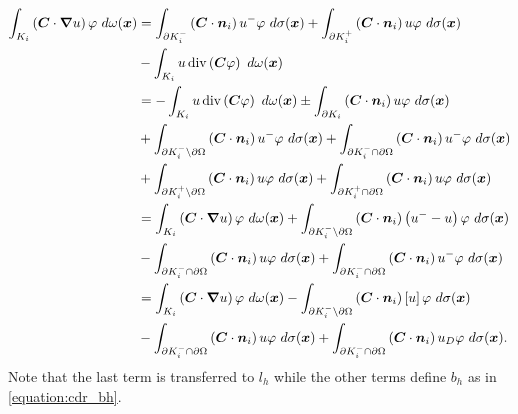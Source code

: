 \begin{align}
    \int_{K_i} \left( \bm{C} \cdot \bm{\nabla} u \right) \varphi ~ d \omega(\bm{x}) &= \int_{\partial K_i^-} \left( \bm{C} \cdot \bm{n}_i \right) u^- \varphi ~ d \sigma(\bm{x}) + \int_{\partial K_i^+} \left( \bm{C} \cdot \bm{n}_i \right) u \varphi ~ d \sigma(\bm{x}) \notag \\
    &- \int_{K_i} u \operatorname*{div} \left( \bm{C} \varphi \right) ~ d \omega(\bm{x}) \notag \\
    &= - \int_{K_i} u \operatorname*{div} \left( \bm{C} \varphi \right) ~ d \omega(\bm{x}) \pm \int_{\partial K_i} \left( \bm{C} \cdot \bm{n}_i \right) u \varphi ~ d \sigma(\bm{x}) \notag \\
    &+ \int_{\partial K_i^- \setminus \partial \Omega} \left( \bm{C} \cdot \bm{n}_i \right) u^- \varphi ~ d \sigma(\bm{x}) + \int_{\partial K_i^- \cap \partial \Omega} \left( \bm{C} \cdot \bm{n}_i \right) u^- \varphi ~ d \sigma(\bm{x}) \notag \\
    &+ \int_{\partial K_i^+ \setminus \partial \Omega} \left( \bm{C} \cdot \bm{n}_i \right) u \varphi ~ d \sigma(\bm{x}) + \int_{\partial K_i^+ \cap \partial \Omega} \left( \bm{C} \cdot \bm{n}_i \right) u \varphi ~ d \sigma(\bm{x}) \notag \\
    &= \int_{K_i} \left( \bm{C} \cdot \bm{\nabla} u \right) \varphi ~ d \omega(\bm{x}) + \int_{\partial K_i^- \setminus \partial \Omega} \left( \bm{C} \cdot \bm{n}_i \right) \left( u^- - u \right) \varphi ~ d \sigma(\bm{x}) \notag \\
    &- \int_{\partial K_i^- \cap \partial \Omega} \left( \bm{C} \cdot \bm{n}_i \right) u \varphi ~ d \sigma(\bm{x}) + \int_{\partial K_i^- \cap \partial \Omega} \left( \bm{C} \cdot \bm{n}_i \right) u^- \varphi ~ d \sigma(\bm{x}) \notag \\
    &= \int_{K_i} \left( \bm{C} \cdot \bm{\nabla} u \right) \varphi ~ d \omega(\bm{x}) - \int_{\partial K_i^- \setminus \partial \Omega} \left( \bm{C} \cdot \bm{n}_i \right) \left[ u \right] \varphi ~ d \sigma(\bm{x}) \\
    &- \int_{\partial K_i^- \cap \partial \Omega} \left( \bm{C} \cdot \bm{n}_i \right) u \varphi ~ d \sigma(\bm{x}) + \int_{\partial K_i^- \cap \partial \Omega} \left( \bm{C} \cdot \bm{n}_i \right) u_D \varphi ~ d \sigma(\bm{x}). \notag
\end{align}
Note that the last term is transferred to $l_h$ while the other terms define $b_h$ as in \eqref{equation:cdr_bh}.

